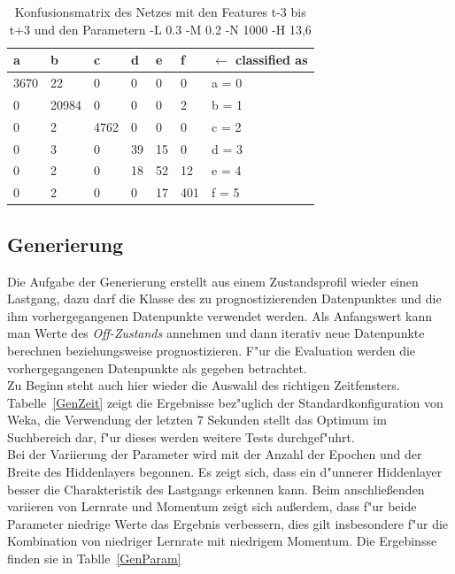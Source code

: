 \begin{table}[p]
\begin{tabular}{llllll|l}
a & b & c & d & e & f & $\leftarrow$ classified as  \\
\hline
3670 & 22 & 0 & 0 & 0 & 0 & a = 0  \\
0 & 20984 & 0 & 0 & 0 & 2 & b = 1  \\
0 & 2 & 4762 & 0 & 0 & 0 & c = 2  \\
0 & 3 & 0 & 39 & 15 & 0 & d = 3  \\
0 & 2 & 0 & 18 & 52 & 12 & e = 4  \\
0 & 2 & 0 & 0 & 17 & 401 & f = 5  \\
\end{tabular}
\caption[Konfusionsmatrix]{Konfusionsmatrix des Netzes mit den Features t-3 bis t+3 und den Parametern -L 0.3 -M 0.2 -N 1000 -H 13,6}
\label{EvalConf}
\end{table}

\newpage
\subsection{Generierung}
\label{EvalGenerierung}
Die Aufgabe der Generierung erstellt aus einem Zustandsprofil wieder einen Lastgang, dazu darf die Klasse des zu prognostizierenden Datenpunktes und die ihm vorhergegangenen Datenpunkte verwendet werden. Als Anfangswert kann man Werte des \textit{Off-Zustands} annehmen und dann iterativ neue Datenpunkte berechnen beziehungsweise prognostizieren. F"ur die Evaluation werden die vorhergegangenen Datenpunkte als gegeben betrachtet. \\

Zu Beginn steht auch hier wieder die Auswahl des richtigen Zeitfensters. Tabelle~\ref{GenZeit} zeigt die Ergebnisse bez"uglich der Standardkonfiguration von Weka, die Verwendung der letzten 7 Sekunden stellt das Optimum im Suchbereich dar, f"ur dieses werden weitere Tests durchgef"uhrt.\\

Bei der Variierung der Parameter wird mit der Anzahl der Epochen und der Breite des Hiddenlayers begonnen. Es zeigt sich, dass ein d"unnerer Hiddenlayer besser die Charakteristik des Lastgangs erkennen kann. Beim anschlie{\ss}enden variieren von Lernrate und Momentum zeigt sich au{\ss}erdem, dass f"ur beide Parameter niedrige Werte das Ergebnis verbessern, dies gilt insbesondere f"ur die Kombination von niedriger Lernrate mit niedrigem Momentum. Die Ergebinsse finden sie in Tablle~\ref{GenParam} \\

